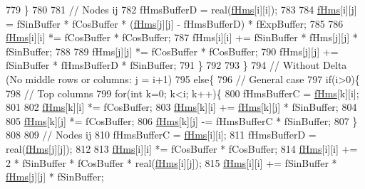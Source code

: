 \begin{DoxyCode}
779       \}
780 
781       \textcolor{comment}{// Nodes ij}
782       fHmsBufferD = real(\hyperlink{classOscProb_1_1PMNS__Base_adf5901166216e8c7a5cff2092952f473}{fHms}[i][i]);
783 
784       \hyperlink{classOscProb_1_1PMNS__Base_adf5901166216e8c7a5cff2092952f473}{fHms}[i][j] = fSinBuffer * fCosBuffer * (\hyperlink{classOscProb_1_1PMNS__Base_adf5901166216e8c7a5cff2092952f473}{fHms}[j][j] - fHmsBufferD) * fExpBuffer;
785 
786       \hyperlink{classOscProb_1_1PMNS__Base_adf5901166216e8c7a5cff2092952f473}{fHms}[i][i] *= fCosBuffer * fCosBuffer;
787       fHms[i][i] += fSinBuffer * fHms[j][j] * fSinBuffer;
788 
789       fHms[j][j] *= fCosBuffer * fCosBuffer;
790       fHms[j][j] += fSinBuffer * fHmsBufferD * fSinBuffer;
791     \}
792 
793   \}
794   \textcolor{comment}{// Without Delta (No middle rows or columns: j = i+1)}
795   \textcolor{keywordflow}{else}\{
796     \textcolor{comment}{// General case}
797     \textcolor{keywordflow}{if}(i>0)\{
798       \textcolor{comment}{// Top columns}
799       \textcolor{keywordflow}{for}(\textcolor{keywordtype}{int} k=0; k<i; k++)\{
800         fHmsBufferC = \hyperlink{classOscProb_1_1PMNS__Base_adf5901166216e8c7a5cff2092952f473}{fHms}[k][i];
801 
802         \hyperlink{classOscProb_1_1PMNS__Base_adf5901166216e8c7a5cff2092952f473}{fHms}[k][i] *= fCosBuffer;
803         \hyperlink{classOscProb_1_1PMNS__Base_adf5901166216e8c7a5cff2092952f473}{fHms}[k][i] += \hyperlink{classOscProb_1_1PMNS__Base_adf5901166216e8c7a5cff2092952f473}{fHms}[k][j] * fSinBuffer;
804 
805         \hyperlink{classOscProb_1_1PMNS__Base_adf5901166216e8c7a5cff2092952f473}{fHms}[k][j] *= fCosBuffer;
806         \hyperlink{classOscProb_1_1PMNS__Base_adf5901166216e8c7a5cff2092952f473}{fHms}[k][j] -= fHmsBufferC * fSinBuffer;
807       \}
808 
809       \textcolor{comment}{// Nodes ij}
810       fHmsBufferC = \hyperlink{classOscProb_1_1PMNS__Base_adf5901166216e8c7a5cff2092952f473}{fHms}[i][i];
811       fHmsBufferD = real(\hyperlink{classOscProb_1_1PMNS__Base_adf5901166216e8c7a5cff2092952f473}{fHms}[j][j]);
812 
813       \hyperlink{classOscProb_1_1PMNS__Base_adf5901166216e8c7a5cff2092952f473}{fHms}[i][i] *= fCosBuffer * fCosBuffer;
814       \hyperlink{classOscProb_1_1PMNS__Base_adf5901166216e8c7a5cff2092952f473}{fHms}[i][i] += 2 * fSinBuffer * fCosBuffer * real(\hyperlink{classOscProb_1_1PMNS__Base_adf5901166216e8c7a5cff2092952f473}{fHms}[i][j]);
815       \hyperlink{classOscProb_1_1PMNS__Base_adf5901166216e8c7a5cff2092952f473}{fHms}[i][i] += fSinBuffer * \hyperlink{classOscProb_1_1PMNS__Base_adf5901166216e8c7a5cff2092952f473}{fHms}[j][j] * fSinBuffer;

\end{DoxyCode}

